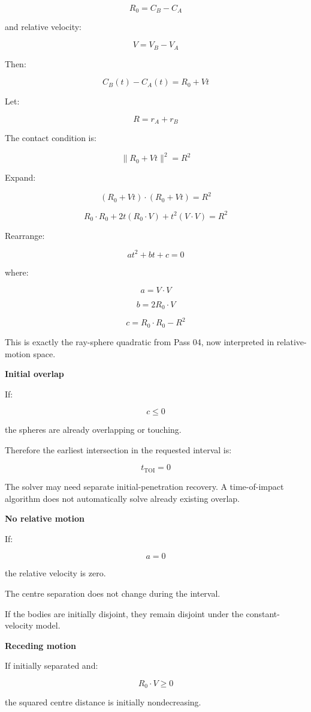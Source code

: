 \[
\boxed{ R_0=C_B-C_A }
\]

and relative velocity:

\[
\boxed{ V=V_B-V_A }
\]

Then:

\[
C_B(t)-C_A(t)=R_0+Vt
\]

Let:

\[
R=r_A+r_B
\]

The contact condition is:

\[
\boxed{ \|R_0+Vt\|^2=R^2 }
\]

Expand:

\[
(R_0+Vt)\cdot(R_0+Vt)=R^2
\]

\[
R_0\cdot R_0+ 2t(R_0\cdot V)+ t^2(V\cdot V)=R^2
\]

Rearrange:

\[
\boxed{ at^2+bt+c=0 }
\]

where:

\[
\boxed{ a=V\cdot V }
\]

\[
\boxed{ b=2R_0\cdot V }
\]

\[
\boxed{ c=R_0\cdot R_0-R^2 }
\]

This is exactly the ray-sphere quadratic from Pass 04, now interpreted in relative-motion space.

\textbf{Initial overlap}

If:

\[
c\le0
\]

the spheres are already overlapping or touching.

Therefore the earliest intersection in the requested interval is:

\[
\boxed{t_{\mathrm{TOI}}=0}
\]

The solver may need separate initial-penetration recovery. A time-of-impact algorithm does not automatically solve already existing overlap.

\textbf{No relative motion}

If:

\[
a=0
\]

the relative velocity is zero.

The centre separation does not change during the interval.

If the bodies are initially disjoint, they remain disjoint under the constant-velocity model.

\textbf{Receding motion}

If initially separated and:

\[
R_0\cdot V\ge0
\]

the squared centre distance is initially nondecreasing.

